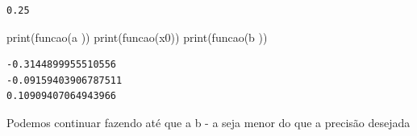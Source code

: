 \documentclass[
  letterpaper,
  DIV=11,
  numbers=noendperiod]{scrreprt}
\newenvironment{Shaded}{\begin{snugshade}}{\end{snugshade}}
\newcommand{\BuiltInTok}[1]{\textcolor[rgb]{0.00,0.23,0.31}{#1}}
\newcommand{\NormalTok}[1]{\textcolor[rgb]{0.00,0.23,0.31}{#1}}
\begin{document}
\begin{verbatim}
0.25
\end{verbatim}

\begin{Shaded}
\begin{Highlighting}[]
\BuiltInTok{print}\NormalTok{(funcao(a ))}
\BuiltInTok{print}\NormalTok{(funcao(x0))}
\BuiltInTok{print}\NormalTok{(funcao(b ))}
\end{Highlighting}
\end{Shaded}

\begin{verbatim}
-0.3144899955510556
-0.09159403906787511
0.10909407064943966
\end{verbatim}

Podemos continuar fazendo até que a \textbar b - a\textbar{} seja menor
do que a precisão desejada
\end{document}
